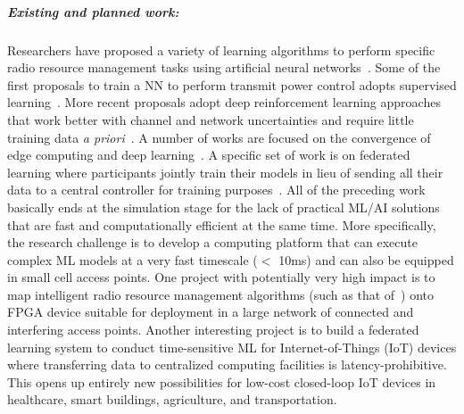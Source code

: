 \subparagraph*{Existing and planned work:} Researchers have proposed a variety of learning algorithms to perform specific radio resource management tasks using artificial neural networks~\cite{
calabrese2018learning,
challita2018proactive,
huang2020deep,
zhu2020toward}.
Some of the first proposals to train a NN to perform transmit power control adopts supervised learning~\cite{sun2018learning,liang2019towards}.  
More recent proposals adopt deep reinforcement learning approaches that work better with channel and network uncertainties and require little training data {\em a priori}~\cite{nasir2020deep,zhao2019deep,liang2019spectrum,meng2020power}.
A number of works are focused on the convergence of edge computing and deep learning~\cite{chen2019deep,zhang2019deep,wang2020convergence}.  
A specific set of work is on federated learning where participants jointly train their models in lieu of sending all their data to a central controller for training purposes~\cite{niknam2020federated,amiri2020federated,chen2021convergence,ren2020scheduling}.
All of the preceding work basically ends at the simulation stage for the lack of practical ML/AI solutions that are fast and computationally efficient at the same time.  More specifically, the research challenge is to develop a computing platform that can execute complex ML models at a very fast timescale ($<$ 10\unit{ms}) and can also be equipped in small cell access points.
One project with potentially very high impact is to map intelligent radio resource management algorithms (such as that of~\cite{nasir2020deep}) onto FPGA device suitable for deployment in a large network of connected and interfering access points.
Another interesting project is to build a federated learning system to conduct time-sensitive ML for Internet-of-Things (IoT) devices where transferring data to centralized computing facilities is latency-prohibitive.  
This opens up entirely new possibilities for low-cost closed-loop IoT devices in healthcare, smart buildings, agriculture, and transportation.

